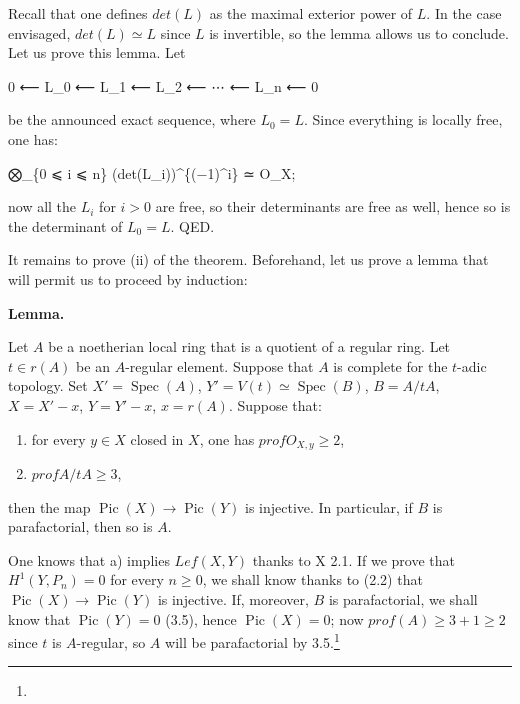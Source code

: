 \documentclass[
]{article}
\newenvironment{Shaded}{}{}
\newcommand{\NormalTok}[1]{#1}
\providecommand{\tightlist}{%
  \setlength{\itemsep}{0pt}\setlength{\parskip}{0pt}}
\begin{document}
Recall that one defines \(det(L)\) as the maximal exterior power of
\(L\). In the case envisaged, \(det(L) \simeq L\) since \(L\) is
invertible, so the lemma allows us to conclude. Let us prove this lemma.
Let

\begin{Shaded}
\begin{Highlighting}[]
\NormalTok{0 ⟵ L\_0 ⟵ L\_1 ⟵ L\_2 ⟵ ⋯ ⟵ L\_n ⟵ 0}
\end{Highlighting}
\end{Shaded}

be the announced exact sequence, where \(L_{0} = L\). Since everything
is locally free, one has:

\begin{Shaded}
\begin{Highlighting}[]
\NormalTok{⨂\_\{0 ⩽ i ⩽ n\} (det(L\_i))\^{}\{(−1)\^{}i\} ≃ O\_X;}
\end{Highlighting}
\end{Shaded}

now all the \(L_{i}\) for \(i > 0\) are free, so their determinants are
free as well, hence so is the determinant of \(L_{0} = L\). QED.

It remains to prove (ii) of the theorem. Beforehand, let us prove a
lemma that will permit us to proceed by induction:

\textbf{Lemma.}

Let \(A\) be a noetherian local ring that is a quotient of a regular
ring. Let \(t \in r(A)\) be an \(A\)-regular element. Suppose that \(A\)
is complete for the \(t\)-adic topology. Set
\(X' = \operatorname{Spec}(A)\),
\(Y' = V(t) \simeq \operatorname{Spec}(B)\), \(B = A/tA\),
\(X = X' - {x}\), \(Y = Y' - {x}\), \(x = r(A)\). Suppose that:

\begin{enumerate}
\def\labelenumi{\arabic{enumi}.}
\tightlist
\item
  for every \(y \in X\) closed in \(X\), one has
  \(prof O_{X,y} \geqslant 2\),
\item
  \(prof A/tA \geqslant 3\),
\end{enumerate}

then the map \(\operatorname{Pic}(X) \to \operatorname{Pic}(Y)\) is
injective. In particular, if \(B\) is parafactorial, then so is \(A\).

One knows that a) implies \(Lef(X, Y)\) thanks to X 2.1. If we prove
that \(H^{1}(Y, P_{n}) = 0\) for every \(n \geqslant 0\), we shall know
thanks to (2.2) that \(\operatorname{Pic}(X) \to \operatorname{Pic}(Y)\)
is injective. If, moreover, \(B\) is parafactorial, we shall know that
\(\operatorname{Pic}(Y) = 0\) (3.5), hence
\(\operatorname{Pic}(X) = 0\); now
\(prof(A) \geqslant 3 + 1 \geqslant 2\) since \(t\) is \(A\)-regular, so
\(A\) will be parafactorial by 3.5.\footnote{}
\end{document}
